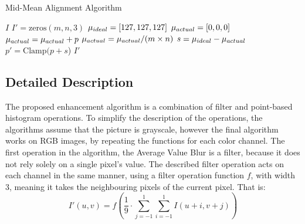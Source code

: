 \documentclass[journal,transmag]{IEEEtran}
\begin{document}
\begin{algorithm}[tp!]
\caption{Mid-Mean Alignment Algorithm}
\label{alg:mma}
\begin{algorithmic}[1]
 {$I$} 
	\State $I' = \mbox{zeros}(m, n, 3)$
	\State $\mu_{\mbox{\tiny{ideal}}} = [127, 127, 127]$
	\State $\mu_{\mbox{\tiny{actual}}} = [0, 0, 0]$
	\State 
		\State $\mu_{\mbox{\tiny{actual}}} = \mu_{\mbox{\tiny{actual}}} + p$
	\EndFor
	\State
	\State $\mu_{\mbox{\tiny{actual}}} = \mu_{\mbox{\tiny{actual}}} / (m \times n)$
	\State $s = \mu_{\mbox{\tiny{ideal}}} - \mu_{\mbox{\tiny{actual}}}$
	\State 
		\State $p' = \mbox{Clamp(}p + s$)
	\EndFor
	\State 
	\State
	\Return $I'$
\EndFunction
\end{algorithmic}
\end{algorithm}

\clearpage
\subsection{Detailed Description}

The proposed enhancement algorithm is a combination of filter and point-based histogram operations. To simplify the description of the operations, the algorithms assume that the picture is grayscale, however the final algorithm works on RGB images, by repeating the functions for each color channel. 
The first operation in the algorithm, the Average Value Blur is a filter, because it does not rely solely on a single pixel's value. The described filter operation acts on each channel in the same manner, using a filter operation function $f$, with width 3, meaning it takes the neighbouring pixels of the current pixel\cite{averageFilter}. That is: 
\begin{equation}
	I'(u, v) = f(\frac{1}{9}\cdot\sum_{j=-1}^{1}\sum_{i=-1}^{1}I(u+i, v+j))
\end{equation}
\end{document}

